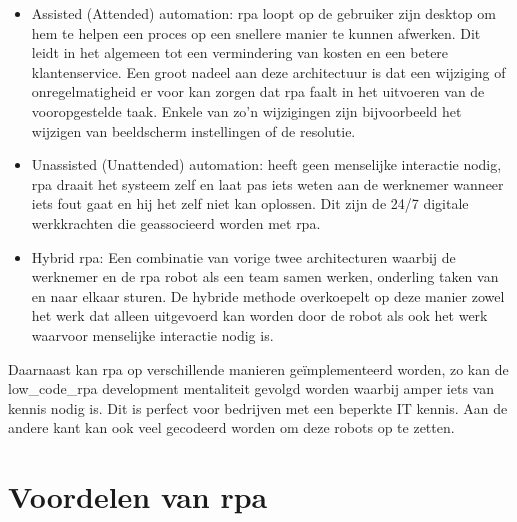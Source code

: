 \begin{itemize}
	\item Assisted (Attended) automation: \acrshort{rpa} loopt op de gebruiker zijn desktop om hem te helpen een proces op een snellere manier te kunnen afwerken. Dit leidt in het algemeen tot een vermindering van kosten en een betere klantenservice. Een groot nadeel aan deze architectuur is dat een wijziging of onregelmatigheid er voor kan zorgen dat \acrshort{rpa} faalt in het uitvoeren van de vooropgestelde taak. Enkele van zo'n wijzigingen zijn bijvoorbeeld het wijzigen van beeldscherm instellingen of de resolutie.
	\item Unassisted (Unattended) automation: heeft geen menselijke interactie nodig, \acrshort{rpa} draait het systeem zelf en laat pas iets weten aan de werknemer wanneer iets fout gaat en hij het zelf niet kan oplossen. Dit zijn de 24/7 digitale werkkrachten die geassocieerd worden met \acrshort{rpa}.
	\item Hybrid \acrshort{rpa}: Een combinatie van vorige twee architecturen waarbij de werknemer en de \acrshort{rpa} robot als een team samen werken, onderling taken van en naar elkaar sturen. De hybride methode overkoepelt op deze manier zowel het werk dat alleen uitgevoerd kan worden door de robot als ook het werk waarvoor menselijke interactie nodig is.
\end{itemize}

Daarnaast kan \acrshort{rpa} op verschillende manieren geïmplementeerd worden, zo kan de \gls{low_code_rpa} development mentaliteit gevolgd worden waarbij amper iets van kennis nodig is. Dit is perfect voor bedrijven met een beperkte IT kennis. Aan de andere kant kan ook veel gecodeerd worden om deze robots op te zetten.
\autocite{everythingRPA}

\section{Voordelen van \acrshort{rpa}}

